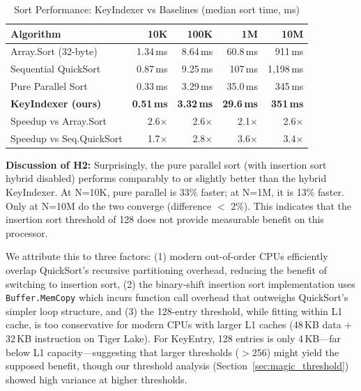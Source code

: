 \documentclass[conference]{IEEEtran}
\begin{document}
\begin{table}[htbp]
    \caption{Sort Performance: KeyIndexer vs Baselines (median sort time, ms)}
    \label{tab:speedup}
    \centering
    \begin{tabular}{lrrrr}
        \toprule
        \textbf{Algorithm} & \textbf{10K} & \textbf{100K} & \textbf{1M} & \textbf{10M} \\
        \midrule
        Array.Sort (32-byte) & 1.34\,ms & 8.64\,ms & 60.8\,ms & 911\,ms \\
        Sequential QuickSort & 0.87\,ms & 9.25\,ms & 107\,ms & 1,198\,ms \\
        Pure Parallel Sort & 0.33\,ms & 3.29\,ms & 35.0\,ms & 345\,ms \\
        \textbf{KeyIndexer (ours)} & \textbf{0.51\,ms} & \textbf{3.32\,ms} & \textbf{29.6\,ms} & \textbf{351\,ms} \\
        \midrule
        Speedup vs Array.Sort & 2.6$\times$ & 2.6$\times$ & 2.1$\times$ & 2.6$\times$ \\
        Speedup vs Seq.QuickSort & 1.7$\times$ & 2.8$\times$ & 3.6$\times$ & 3.4$\times$ \\
        \bottomrule
    \end{tabular}
\end{table}

\textbf{Discussion of H2:} Surprisingly, the pure parallel sort (with insertion sort hybrid disabled) performs comparably to or slightly better than the hybrid KeyIndexer. At N=10K, pure parallel is 33\% faster; at N=1M, it is 13\% faster. Only at N=10M do the two converge (difference $<$ 2\%). This indicates that the insertion sort threshold of 128 does not provide measurable benefit on this processor.

We attribute this to three factors: (1) modern out-of-order CPUs efficiently overlap QuickSort's recursive partitioning overhead, reducing the benefit of switching to insertion sort, (2) the binary-shift insertion sort implementation uses \texttt{Buffer.MemCopy} which incurs function call overhead that outweighs QuickSort's simpler loop structure, and (3) the 128-entry threshold, while fitting within L1 cache, is too conservative for modern CPUs with larger L1 caches (48\,KB data + 32\,KB instruction on Tiger Lake). For KeyEntry, 128 entries is only 4\,KB---far below L1 capacity---suggesting that larger thresholds ($>$256) might yield the supposed benefit, though our threshold analysis (Section~\ref{sec:magic_threshold}) showed high variance at higher thresholds.
\end{document}
